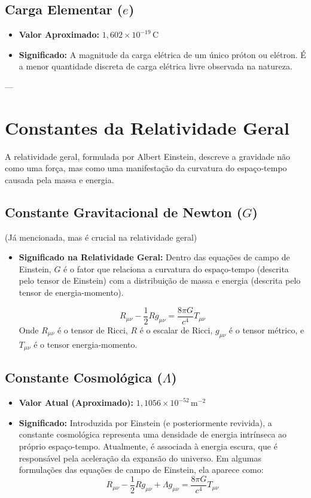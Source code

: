 \documentclass{article}
\begin{document}
\subsection{Carga Elementar ($e$)}
\begin{itemize}
    \item \textbf{Valor Aproximado:} $1,602 \times 10^{-19} \, \text{C}$
    \item \textbf{Significado:} A magnitude da carga elétrica de um único próton ou elétron. É a menor quantidade discreta de carga elétrica livre observada na natureza.
\end{itemize}

---

\section{Constantes da Relatividade Geral}
A relatividade geral, formulada por Albert Einstein, descreve a gravidade não como uma força, mas como uma manifestação da curvatura do espaço-tempo causada pela massa e energia.

\subsection{Constante Gravitacional de Newton ($G$)}
(Já mencionada, mas é crucial na relatividade geral)
\begin{itemize}
    \item \textbf{Significado na Relatividade Geral:} Dentro das equações de campo de Einstein, $G$ é o fator que relaciona a curvatura do espaço-tempo (descrita pelo tensor de Einstein) com a distribuição de massa e energia (descrita pelo tensor de energia-momento).

    \begin{equation*}
        R_{\mu\nu} - \frac{1}{2}Rg_{\mu\nu} = \frac{8\pi G}{c^4} T_{\mu\nu}
    \end{equation*}
    Onde $R_{\mu\nu}$ é o tensor de Ricci, $R$ é o escalar de Ricci, $g_{\mu\nu}$ é o tensor métrico, e $T_{\mu\nu}$ é o tensor energia-momento.
\end{itemize}

\subsection{Constante Cosmológica ($\Lambda$)}
\begin{itemize}
    \item \textbf{Valor Atual (Aproximado):} $1,1056 \times 10^{-52} \, \text{m}^{-2}$
    \item \textbf{Significado:} Introduzida por Einstein (e posteriormente revivida), a constante cosmológica representa uma densidade de energia intrínseca ao próprio espaço-tempo. Atualmente, é associada à energia escura, que é responsável pela aceleração da expansão do universo. Em algumas formulações das equações de campo de Einstein, ela aparece como:
    \begin{equation*}
        R_{\mu\nu} - \frac{1}{2}Rg_{\mu\nu} + \Lambda g_{\mu\nu} = \frac{8\pi G}{c^4} T_{\mu\nu}
    \end{equation*}
\end{itemize}
\end{document}
